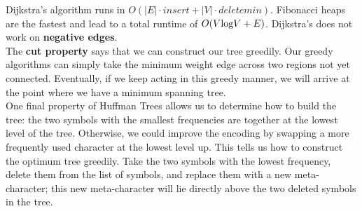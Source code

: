 \documentclass{article}
\begin{document}
\noindent 
Dijkstra's algorithm runs in $O(|E|\cdot insert + |V|\cdot deletemin)$.  Fibonacci heaps are the fastest and lead to a total runtime of $O(V\textup{log}V + E)$.  Dijkstra's does not work on \textbf{negative edges}. \\

\noindent
The \textbf{cut property} says that we can construct our tree greedily. Our greedy algorithms can simply take the
minimum weight edge across two regions not yet connected. Eventually, if we keep acting in this greedy manner,
we will arrive at the point where we have a minimum spanning tree. \\

\noindent
One final property of Huffman Trees allows us to determine how to build the tree: the two symbols with the smallest frequencies are together at the lowest level of the tree. Otherwise, we could improve the encoding by swapping a more frequently used character at the lowest level up.  This tells us how to construct the optimum tree greedily. Take the two symbols with the lowest frequency, delete them from the list of symbols, and replace them with a new meta-character; this new meta-character will lie directly above the two deleted symbols in the tree.
\end{document}
